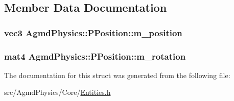 \subsection{Member Data Documentation}
\hypertarget{struct_agmd_physics_1_1_p_position_aec3891c1a6322ec0558f3e2a49a0112a}{
\subsubsection[{m\+\_\+position}]{\setlength{\rightskip}{0pt plus 5cm}vec3 Agmd\+Physics\+::\+P\+Position\+::m\+\_\+position}}\label{struct_agmd_physics_1_1_p_position_aec3891c1a6322ec0558f3e2a49a0112a}
\hypertarget{struct_agmd_physics_1_1_p_position_aa0885cffb4ccad5c6afdd80b5ff70649}{
\subsubsection[{m\+\_\+rotation}]{\setlength{\rightskip}{0pt plus 5cm}mat4 Agmd\+Physics\+::\+P\+Position\+::m\+\_\+rotation}}\label{struct_agmd_physics_1_1_p_position_aa0885cffb4ccad5c6afdd80b5ff70649}


The documentation for this struct was generated from the following file\+:\begin{DoxyCompactItemize}
\item 
src/\+Agmd\+Physics/\+Core/\hyperlink{_agmd_physics_2_core_2_entities_8h}{Entities.\+h}\end{DoxyCompactItemize}
